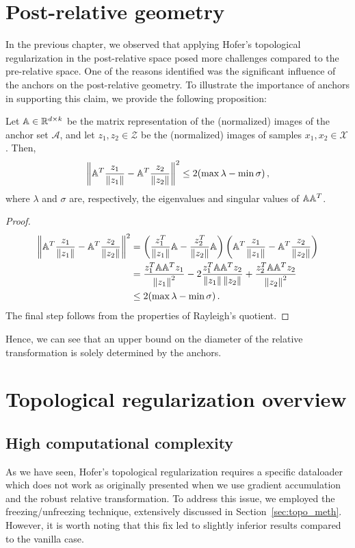 \documentclass[../main.tex]{subfiles}
\begin{document}
\section{Post-relative geometry}
In the previous chapter, we observed that applying Hofer's topological regularization in the post-relative space posed more challenges compared to the pre-relative space. One of the reasons identified was the significant influence of the anchors on the post-relative geometry. To illustrate the importance of anchors in supporting this claim, we provide the following proposition:

\begin{proposition}
Let $\mathbb{A}\in \mathbb{R}^{d \times k}$ be the matrix representation of the (normalized) images of the anchor set $\mathcal{A}$, and let $z_1, z_2 \in \mathcal{Z}$ be the (normalized) images of samples $x_1, x_2 \in \mathcal{X}$. Then,
\[
\left\lVert \mathbb{A}^T\frac{z_1}{\left\lVert z_1 \right\rVert} - \mathbb{A}^T\frac{z_2}{\left\lVert z_2 \right\rVert} \right\rVert^2 \leq 2(\max \lambda - \min \sigma)\,,
\]
where $\lambda$ and $\sigma$ are, respectively, the eigenvalues and singular values of $\mathbb{A}\mathbb{A}^T$.
\end{proposition}
\begin{proof}
    \begin{align*}
        \left\lVert \mathbb{A}^T\frac{z_1}{\left\lVert z_1 \right\rVert} - \mathbb{A}^T\frac{z_2}{\left\lVert z_2 \right\rVert} \right\rVert^2 &= \left(\frac{z_1^T}{\left\lVert z_1 \right\rVert}\mathbb{A} - \frac{z_2^T}{\left\lVert z_2 \right\rVert}\mathbb{A}\right)\left(\mathbb{A}^T\frac{z_1}{\left\lVert z_1 \right\rVert} - \mathbb{A}^T\frac{z_2}{\left\lVert z_2 \right\rVert}\right)\\
        &=\frac{z_1^T\mathbb{A}\mathbb{A}^Tz_1}{\left\lVert z_1 \right\rVert^2} -2\frac{z_1^T\mathbb{A}\mathbb{A}^Tz_2}{\left\lVert z_1 \right\rVert\left\lVert z_2 \right\rVert}+ \frac{z_2^T\mathbb{A}\mathbb{A}^Tz_2}{\left\lVert z_2 \right\rVert^2}\\
        &\leq 2(\max \lambda - \min \sigma)\,.
    \end{align*}
The final step follows from the properties of Rayleigh's quotient.
\end{proof}

Hence, we can see that an upper bound on the diameter of the relative transformation is solely determined by the anchors.


\section{Topological regularization overview}
\label{sec:more_topo}

\subsection{High computational complexity}
As we have seen, Hofer's topological regularization requires a specific dataloader which does not work as originally presented when we use gradient accumulation and the robust relative transformation. To address this issue, we employed the freezing/unfreezing technique, extensively discussed in Section~\ref{sec:topo_meth}. However, it is worth noting that this fix led to slightly inferior results compared to the vanilla case.\\
\end{document}

